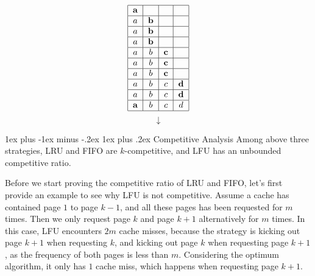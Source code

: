 \documentclass[11pt]{article}
\makeatletter
\renewcommand{\subsection}{\@startsection{subsection}{2}{0mm}%
                                   {1ex plus -1ex minus -.2ex}%
                                   {1ex plus .2ex}%
                                   {\normalfont\large\bfseries}}%
\makeatother
\begin{document}
\[
\begin{tabular}{|c|c|c|c|}
\hline ${\bf a}$ & &     &\\
\hline $a$ &  ${\bf b}$& &\\
\hline $a$&${\bf b}$ &&  \\
\hline $a$&${\bf b}$ &&  \\
\hline $a$&$b$ &${\bf c}$&  \\
\hline $a$&$b$ &${\bf c}$&  \\
\hline $a$&$b$ &${\bf c}$&  \\
\hline $a$&$b$ &$c$&${\bf d}$  \\
\hline $a$&$b$ &$c$&${\bf d}$  \\
\hline ${\bf a}$&$b$ &$c$&$d$  \\
\hline
\end{tabular}
\]
\[
\downarrow
\]
\begin{table*}[!htbp]
	\begin{floatrow}
		\centering
			\caption{Comparison of FIFO, LRU, LFU strategies.}
			\label{fig1}
	\end{floatrow}
\end{table*}


\subsection{Competitive Analysis}
Among above three strategies, LRU and FIFO are $k$-competitive, and LFU has an unbounded competitive ratio. 

Before we start proving the competitive ratio of LRU and FIFO, let's first provide an example to see why LFU is not competitive. Assume a cache has contained page $1$ to page $k-1$, and all these pages has been requested for $m$ times. Then we only request page $k$ and page $k+1$ alternatively for $m$ times. In this case, LFU encounters $2m$ cache misses, because the strategy is kicking out page $k+1$ when requesting $k$, and kicking out page $k$ when requesting page $k+1$, as the frequency of both pages is less than $m$. Considering the optimum algorithm, it only has $1$ cache miss, which happens when requesting page $k+1$.
\end{document}
